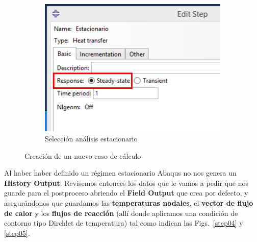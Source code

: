 \begin{figure}
\begin{subfigure}[!h]{0.39\textwidth}
      \includegraphics[width=\textwidth]{./body/images/step03.pdf}
      \caption{Selección análisis estacionario}
      \label{step03}
    \end{subfigure}%
    \caption{Creación de un nuevo caso de cálculo}
  \end{figure}

  Al haber haber definido un régimen estacionario Abaqus no nos
  genera un \textbf{History Output}. Revisemos entonces los datos que
  le vamos a pedir que nos guarde para el postproceso abriendo el
  \textbf{Field Output} que crea por defecto, y asegurándonos que
  guardamos las \textbf{temperaturas nodales}, el \textbf{vector de
    flujo de calor} y los \textbf{flujos de reacción} (allí donde
  aplicamos una condición de contorno tipo Dirchlet de temperatura)
  tal como indican las Figs.~\ref{step04} y \ref{step05}.

